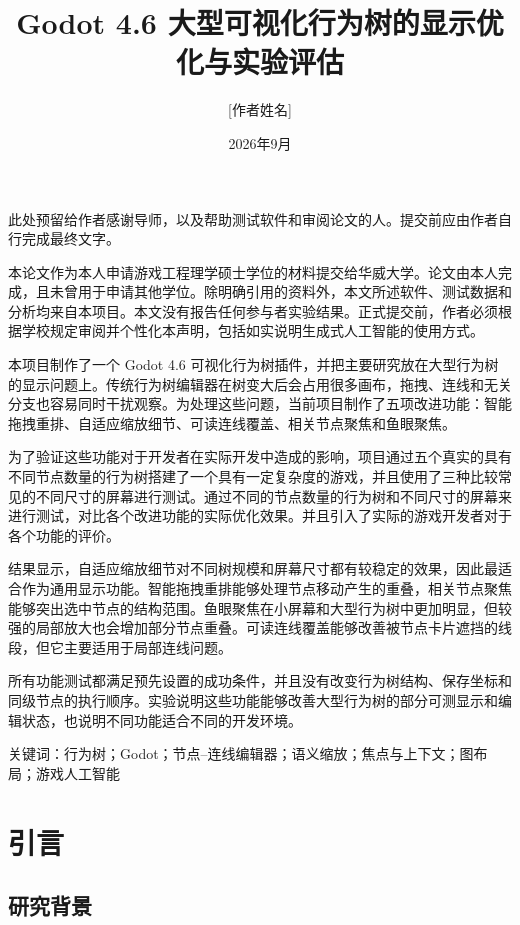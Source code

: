 \documentclass[11pt,a4paper,oneside,extrafontsizes]{memoir}
\title{Godot 4.6 大型可视化行为树的显示优化与实验评估}
\author{[作者姓名]}
\date{2026年9月}
\begin{document}
\frontmatter
{}
\tableofcontents
\clearforchapter\listoffigures
\clearforchapter\listoftables


此处预留给作者感谢导师，以及帮助测试软件和审阅论文的人。提交前应由作者自行完成最终文字。


本论文作为本人申请游戏工程理学硕士学位的材料提交给华威大学。论文由本人完成，且未曾用于申请其他学位。除明确引用的资料外，本文所述软件、测试数据和分析均来自本项目。本文没有报告任何参与者实验结果。正式提交前，作者必须根据学校规定审阅并个性化本声明，包括如实说明生成式人工智能的使用方式。


本项目制作了一个 Godot 4.6 可视化行为树插件，并把主要研究放在大型行为树的显示问题上。传统行为树编辑器在树变大后会占用很多画布，拖拽、连线和无关分支也容易同时干扰观察。为处理这些问题，当前项目制作了五项改进功能：智能拖拽重排、自适应缩放细节、可读连线覆盖、相关节点聚焦和鱼眼聚焦。

为了验证这些功能对于开发者在实际开发中造成的影响，项目通过五个真实的具有不同节点数量的行为树搭建了一个具有一定复杂度的游戏，并且使用了三种比较常见的不同尺寸的屏幕进行测试。通过不同的节点数量的行为树和不同尺寸的屏幕来进行测试，对比各个改进功能的实际优化效果。并且引入了实际的游戏开发者对于各个功能的评价。

结果显示，自适应缩放细节对不同树规模和屏幕尺寸都有较稳定的效果，因此最适合作为通用显示功能。智能拖拽重排能够处理节点移动产生的重叠，相关节点聚焦能够突出选中节点的结构范围。鱼眼聚焦在小屏幕和大型行为树中更加明显，但较强的局部放大也会增加部分节点重叠。可读连线覆盖能够改善被节点卡片遮挡的线段，但它主要适用于局部连线问题。

所有功能测试都满足预先设置的成功条件，并且没有改变行为树结构、保存坐标和同级节点的执行顺序。实验说明这些功能能够改善大型行为树的部分可测显示和编辑状态，也说明不同功能适合不同的开发环境。

关键词：行为树；Godot；节点–连线编辑器；语义缩放；焦点与上下文；图布局；游戏人工智能

\mainmatter

\chapter{引言}

\section{研究背景}
\end{document}
